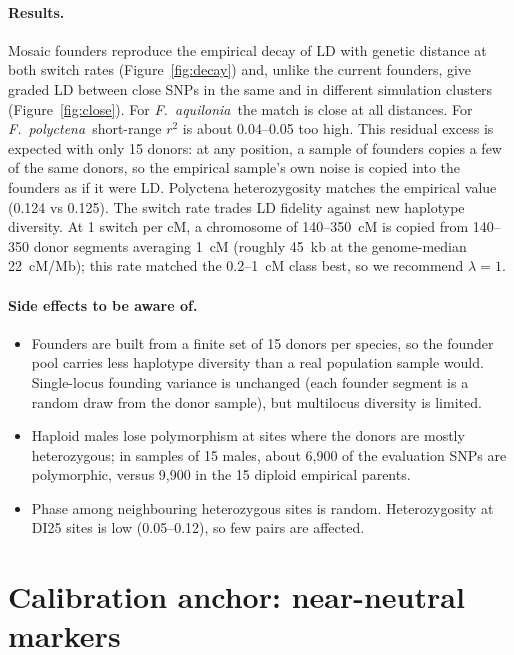 \documentclass[11pt,a4paper]{article}
\newcommand{\Fa}{\textit{F.~aquilonia}}
\newcommand{\Fp}{\textit{F.~polyctena}}
\begin{document}
\paragraph{Results.} Mosaic founders reproduce the empirical decay of LD with genetic distance at both switch rates (Figure~\ref{fig:decay}) and, unlike the current founders, give graded LD between close SNPs in the same and in different simulation clusters (Figure~\ref{fig:close}). For \Fa\ the match is close at all distances. For \Fp\ short-range $r^2$ is about 0.04--0.05 too high. This residual excess is expected with only 15 donors: at any position, a sample of founders copies a few of the same donors, so the empirical sample's own noise is copied into the founders as if it were LD. Polyctena heterozygosity matches the empirical value (0.124 vs 0.125). The switch rate trades LD fidelity against new haplotype diversity. At 1 switch per cM, a chromosome of 140--350~cM is copied from 140--350 donor segments averaging 1~cM (roughly 45~kb at the genome-median 22~cM/Mb); this rate matched the 0.2--1~cM class best, so we recommend $\lambda=1$.

\paragraph{Side effects to be aware of.}
\begin{itemize}
  \item Founders are built from a finite set of 15 donors per species, so the founder pool carries less haplotype diversity than a real population sample would. Single-locus founding variance is unchanged (each founder segment is a random draw from the donor sample), but multilocus diversity is limited.
  \item Haploid males lose polymorphism at sites where the donors are mostly heterozygous; in samples of 15 males, about 6,900 of the evaluation SNPs are polymorphic, versus 9,900 in the 15 diploid empirical parents.
  \item Phase among neighbouring heterozygous sites is random. Heterozygosity at DI25 sites is low (0.05--0.12), so few pairs are affected.
\end{itemize}

\section{Calibration anchor: near-neutral markers}
\label{sec:anchor}
\end{document}
